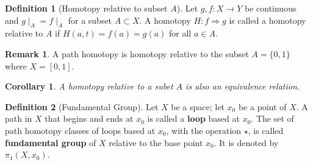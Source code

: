 \documentclass[12pt,reqno]{amsart}
\theoremstyle{plain}
\newtheorem{cor}{Corollary}
\theoremstyle{definition}
\newtheorem{defn}{Definition}
\newtheorem{rem}{Remark}
\begin{document}
\begin{defn}[Homotopy relative to subset $A$]
    Let $g,f \colon X \to Y$ be continuous and $g\mid_A = f\mid_A$ for a subset $A \subset X$. A homotopy $H \colon f \Rightarrow g$ is called a homotopy relative to $A$ if $H(a,t) = f(a) = g(a)$ for all $a \in A$.
\end{defn}
\begin{rem}
    A path homotopy is homotopy relative to the subset $A = \{0,1\}$ where $X = [0,1]$.
\end{rem}
\begin{cor}
    A homotopy relative to a subet $A$ is also an equivalence relation.
\end{cor}
\begin{defn}[Fundamental Group]
    Let $X$ be a space; let $x_0$ be a point of $X$. A path in $X$ that begins and ends at $x_0$ is called a {\bf loop} based at $x_0$. The set of path homotopy classes of loops based at $x_0$, with the operation $\star$, is called {\bf fundamental group} of $X$ relative to the base point $x_0$. It is denoted by $\pi_1(X, x_0)$.
\end{defn}
\end{document}
